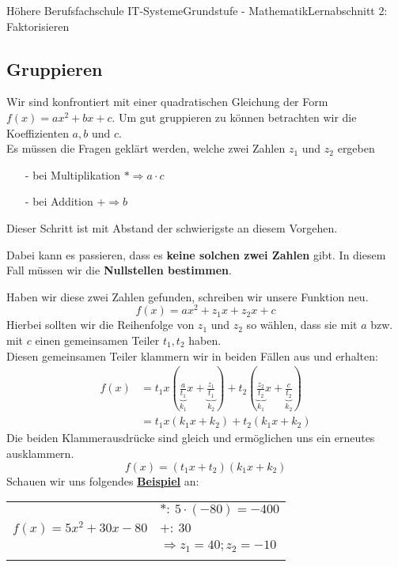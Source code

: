 \documentclass[11pt,twocolumn,oneside,openany,headings=optiontotoc,11pt,numbers=noenddot]{article}
\begin{document}
\begin{worksheet}{Höhere Berufsfachschule IT-Systeme}{Grundstufe - Mathematik}{Lernabschnitt 2: Faktorisieren}
		\subsection{Gruppieren}
		Wir sind konfrontiert mit einer quadratischen Gleichung der Form \(f(x) = ax^2 + bx + c\). Um gut gruppieren zu können betrachten wir die Koeffizienten \(a,b \text{ und } c\).\\
		Es müssen die Fragen geklärt werden, welche zwei Zahlen \(z_1\) und \(z_2\) ergeben
		\begin{itemize}
			\item[-] bei Multiplikation \(*\Rightarrow a\cdot{}c\)
			\item[-] bei Addition \(+\Rightarrow b\)
		\end{itemize}
		Dieser Schritt ist mit Abstand der schwierigste an diesem Vorgehen.
		\begin{framed}
			\noindent
			Dabei kann es passieren, dass es \textbf{keine solchen zwei Zahlen} gibt. In diesem Fall müssen wir die \textbf{Nullstellen bestimmen}.
			\color{red}
		\end{framed}
		\normalcolor
		\noindent
		Haben wir diese zwei Zahlen gefunden, schreiben wir unsere Funktion neu.
		\[f(x) = ax^2 + z_1x + z_2x + c\]
		Hierbei sollten wir die Reihenfolge von \(z_1\) und \(z_2\) so wählen, dass sie mit \(a\) bzw. mit \(c\) einen gemeinsamen Teiler \(t_1, t_2\) haben.\\
		Diesen gemeinsamen Teiler klammern wir in beiden Fällen aus und erhalten:
		\begin{align*}
			f(x) & = t_1x(\underbrace{\frac{a}{t_1}}_{k_1}x + \underbrace{\frac{z_1}{t_1}}_{k_2}) + t_2(\underbrace{\frac{z_2}{t_2}}_{k_1}x + \underbrace{\frac{c}{t_2}}_{k_2})\\
			& = t_1x(k_1x + k_2) + t_2(k_1x+k_2)
		\end{align*}
		Die beiden Klammerausdrücke sind gleich und ermöglichen uns ein erneutes ausklammern.
		\[f(x) = (t_1x+t_2)(k_1x+k_2)\]
		Schauen wir uns folgendes \underline{\textbf{Beispiel}} an:\\
		\par\noindent
		\begin{tabularx}{0.5\textwidth}{X|l}
			\cline{2-2}
			& \(*:\ 5\cdot(-80)=-400\)\\
			\(f(x) = 5x^2 + 30x -80\) & \(+:\ 30\)\\
			& \(\Rightarrow z_1 = 40; z_2 = -10\)\\
			\cline{2-2}
			\multicolumn{2}{l}{}\\

\end{tabularx}
\end{worksheet}
\end{document}
